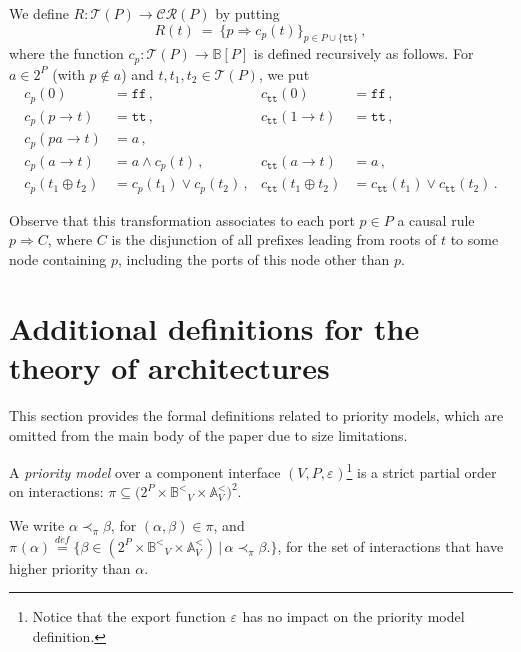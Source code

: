 \documentclass{llncs}
\newcommand{\sA}{\ensuremath{\mathbb{A}}}
\newcommand{\sB}{\ensuremath{\mathbb{B}}}
\newcommand{\bydef}[1]{\ensuremath{\stackrel{\mathit{\scriptscriptstyle def}}{#1}}}
\newcommand{\bsetdef}[2]{\ensuremath{\bigl\{{#1}\,\bigl|\,{#2}\bigr.\bigr\}}}
\newcommand{\true} {\ensuremath{\mathtt{t\!t}}}
\newcommand{\false}{\ensuremath{\mathtt{f\!f}}}
\newcommand{\order}{<}
\newcommand{\ordbool}{\ensuremath{\sB^{\order}}}
\newcommand{\guards}[1]{\ensuremath{\ordbool_{#1}}}
\newcommand{\updates}[1]{\ensuremath{\sA^{\order}_{#1}}}
\newcommand{\filter}[2][]{\ensuremath{\pi_{#1}({#2})}}
\newcommand{\export}[1][]{\ensuremath{\varepsilon_{#1}}}
\newcommand{\ct}{\ensuremath{\mathcal{T}}}
\newcommand{\cru}{\ensuremath{\mathcal{CR}}}
\begin{document}
We define $R: \ct(P) \rightarrow \cru(P)$ by putting
%
\begin{equation} 
  \label{eq:trees2rules}
  R(t)\ =\ \{p \Rightarrow c_p(t)\}_{p\in P\cup\{\true\}}\,,
\end{equation}
where the function $c_p : \ct(P) \rightarrow \sB[P]$ is defined recursively
as follows.  For $a\in 2^P$ (with $p\not\in a$) and $t,t_1,t_2 \in \ct(P)$,
we put
%
\begin{align*}
  c_p(0) & = \false\,, 
  & c_{\true}(0) & = \false\,,\\
  c_p(p \rightarrow t) & = \true\,,
  & c_{\true}(1 \rightarrow t) & = \true\,,\\
  c_p(pa \rightarrow t) & = a\,,\\
  c_p(a \rightarrow t) & = a \land c_p(t)\,,
  & c_{\true}(a \rightarrow t) & = a\,,\\
  c_p(t_1 \oplus t_2) & = c_p(t_1) \lor c_p(t_2)\,, 
  & c_{\true}(t_1 \oplus t_2) & = c_{\true}(t_1) \lor c_{\true}(t_2)\,.
\end{align*}

Observe that this transformation associates to each port $p \in P$ a
causal rule $p \Rightarrow C$, where $C$ is the disjunction of all
prefixes leading from roots of $t$ to some node containing $p$,
including the ports of this node other than $p$.


\section{Additional definitions for the theory of architectures}
\label{secn:arch:appendix}

This section provides the formal definitions related to priority
models, which are omitted from the main body of the paper due to size
limitations.

\begin{definition}
  \label{defn:priority}
  A \emph{priority model} over a component interface $(V, P,
  \export)$\footnote{%
%
    Notice that the export function $\export$ has no impact on the
    priority model definition.
%
  } is a strict partial order on interactions: $\pi
  \subseteq \bigl(2^P \times \guards{V} \times \updates{V} \bigr)^2$.

  We write $\alpha \prec_\pi \beta$, for $(\alpha, \beta) \in \pi$, and 
   $\filter{\alpha} \bydef{=} \bsetdef{\beta \in (2^P \times
    \guards{V} \times \updates{V})}{\alpha \prec_\pi \beta}$, for the set of
  interactions that have higher priority than $\alpha$.
\end{definition}
\end{document}
